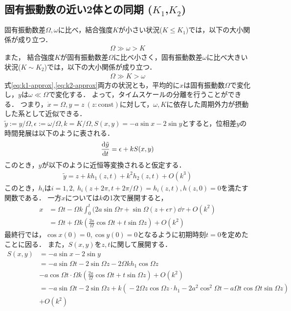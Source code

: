\documentclass[../main]{subfiles}
\begin{document}
    \subsection{固有振動数の近い2体との同期 ($K_1$,$K_2$)}
    \label{sec:3body-k12}
    固有振動数差$\Omega,\omega$に比べ，結合強度$K$が小さい状況($K\leq K_1$)では，以下の大小関係が成り立つ．
    \begin{align}
        \label{eq:k1-approx}
        \Omega\gg\omega>K
    \end{align}
    また，
    結合強度$K$が固有振動数差$\Omega$に比べ小さく，固有振動数差$\omega$に比べ大きい状況($K\sim K_2$)では，以下の大小関係が成り立つ．
    \begin{align}
        \label{eq:k2-approx}
        \Omega\gg K>\omega
    \end{align}
    式\eqref{eq:k1-approx},\eqref{eq:k2-approx}両方の状況とも，平均的に$x$は固有振動数$\Omega$で変化し，$y$は$\omega\ll\Omega$で変化する．
    よって，タイムスケールの分離を行うことができる．
    つまり，$\dot{x}=\Omega, y=z\ (z:\textrm{const})$に対して，$\omega,K$に依存した周期外力が摂動した系として近似できる．\\
    $\tilde{y}:=y/\Omega,\epsilon:=\omega/\Omega,k=K/\Omega,S(x,y)=-a\sin x-2\sin y$とすると，位相差$y$の時間発展は以下のように表される．
    \begin{align*}
        \dv{\tilde{y}}{t}=\epsilon+k S(x,y) 
    \end{align*}
    このとき，$y$が以下のように近恒等変換されると仮定する．
    \begin{align}
        \tilde{y}=z+kh_1(z,t)+k^2h_2(z,t)+O(k^3)
        \label{eq:pertu-ytilde}
    \end{align}
    このとき，$h_i$は$i=1,2,\ h_i(z+2\pi,t+2\pi/\Omega)=h_i(z,t),h(z,0)=0$を満たす関数である．
    一方$x$については$k$の1次で展開すると，
    \begin{align*}
        x&=\Omega t-\Omega k\int_0^t(2a\sin \Omega\tau+\sin\Omega (z+\epsilon\tau)\dd{\tau}+O(k^2)\\ 
        &=\Omega t+\Omega k\left(\frac{2a}{\Omega}\cos\Omega t+t\sin \Omega z\right)+O(k^2)
    \end{align*}
    最終行では，$\cos x(0)=0,\cos y(0)=0$となるように初期時刻$t=0$を定めたことに因る．
    また，$S(x,y)$を$z,t$に関して展開する．
    \begin{align*}
        S(x,y)&=-a\sin x-2\sin y\\
        &=-a\sin\Omega t-2\sin \Omega z-2\Omega kh_1\cos\Omega z\\
        &-a\cos\Omega t\cdot \Omega k\left(\frac{2a}{\Omega}\cos \Omega t+t\sin \Omega z\right)+O(k^2)\\
        &=-a\sin\Omega t-\!2\sin \Omega z       +k\left(\!-2\Omega z \cos\Omega z\cdot h_1-\!2a^2\cos^2\Omega t-\!a\Omega t\cos \Omega  t\sin \Omega z\right)\\
        &+O(k^2)
    \end{align*}
\end{document}
